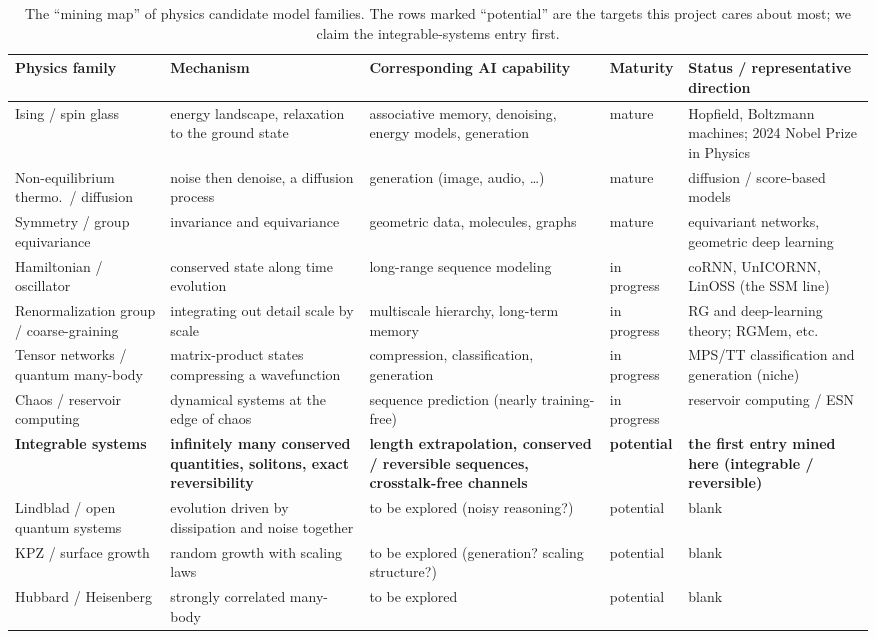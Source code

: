 \documentclass[11pt]{article}
\theoremstyle{definition}
\theoremstyle{plain}
\begin{document}
\begin{table}[h]
\centering
\footnotesize
\setlength{\tabcolsep}{4pt}
\renewcommand{\arraystretch}{1.25}
\begin{tabularx}{\textwidth}{@{}>{\raggedright\arraybackslash}p{2.4cm}
  >{\raggedright\arraybackslash}X >{\raggedright\arraybackslash}X
  >{\centering\arraybackslash}p{1.6cm} >{\raggedright\arraybackslash}X@{}}
\toprule
Physics family & Mechanism & Corresponding AI capability & Maturity & Status / representative direction \\
\midrule
Ising / spin glass & energy landscape, relaxation to the ground state & associative memory, denoising, energy models, generation & mature & Hopfield, Boltzmann machines; 2024 Nobel Prize in Physics \\
Non-equilibrium thermo.\ / diffusion & noise then denoise, a diffusion process & generation (image, audio, \dots) & mature & diffusion / score-based models \\
Symmetry / group equivariance & invariance and equivariance & geometric data, molecules, graphs & mature & equivariant networks, geometric deep learning \\
Hamiltonian / oscillator & conserved state along time evolution & long-range sequence modeling & in progress & coRNN, UnICORNN, LinOSS (the SSM line) \\
Renormalization group / coarse-graining & integrating out detail scale by scale & multiscale hierarchy, long-term memory & in progress & RG and deep-learning theory; RGMem, etc. \\
Tensor networks / quantum many-body & matrix-product states compressing a wavefunction & compression, classification, generation & in progress & MPS/TT classification and generation (niche) \\
Chaos / reservoir computing & dynamical systems at the edge of chaos & sequence prediction (nearly training-free) & in progress & reservoir computing / ESN \\
\textbf{Integrable systems} & \textbf{infinitely many conserved quantities, solitons, exact reversibility} & \textbf{length extrapolation, conserved / reversible sequences, crosstalk-free channels} & \textbf{potential} & \textbf{the first entry mined here (integrable / reversible)} \\
Lindblad / open quantum systems & evolution driven by dissipation and noise together & to be explored (noisy reasoning?) & potential & blank \\
KPZ / surface growth & random growth with scaling laws & to be explored (generation? scaling structure?) & potential & blank \\
Hubbard / Heisenberg & strongly correlated many-body & to be explored & potential & blank \\
\bottomrule
\end{tabularx}
\caption{The ``mining map'' of physics candidate model families. The rows marked ``potential'' are the
targets this project cares about most; we claim the integrable-systems entry first.}
\label{tab:catalog}
\end{table}
\end{document}
